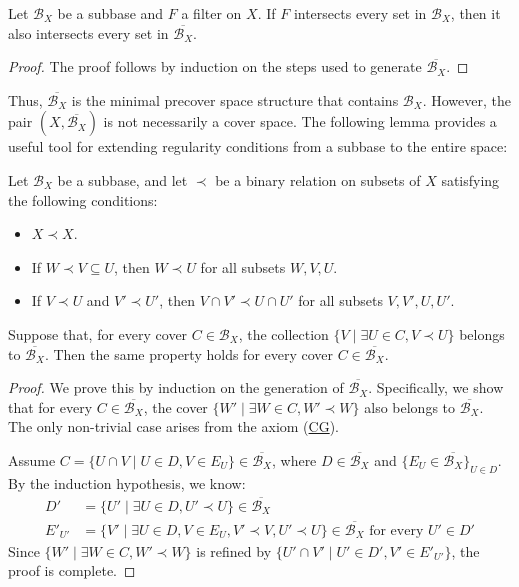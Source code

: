 \documentclass[pdflatex,sn-mathphys-num]{sn-jnl}
\newcommand{\axref}[1]{(\hyperref[ax:#1]{#1})}
\theoremstyle{definition}
\theoremstyle{remark}
\numberwithin{figure}{section}
\newcommand{\rb}{\prec}
\begin{document}
\begin{lem}
Let $\mathcal{B}_X$ be a subbase and $F$ a filter on $X$.
If $F$ intersects every set in $\mathcal{B}_X$, then it also intersects every set in $\overline{\mathcal{B}_X}$.
\end{lem}
\begin{proof}
The proof follows by induction on the steps used to generate $\overline{\mathcal{B}_X}$.
\end{proof}

Thus, $\overline{\mathcal{B}_X}$ is the minimal precover space structure that contains $\mathcal{B}_X$.
However, the pair $(X, \overline{\mathcal{B}_X})$ is not necessarily a cover space.
The following lemma provides a useful tool for extending regularity conditions from a subbase to the entire space:

\begin{lem}
Let $\mathcal{B}_X$ be a subbase, and let $\rb$ be a binary relation on subsets of $X$ satisfying the following conditions:
\begin{itemize}
\item $X \rb X$.
\item If $W \rb V \subseteq U$, then $W \rb U$ for all subsets $W,V,U$.
\item If $V \rb U$ and $V' \rb U'$, then $V \cap V' \rb U \cap U'$ for all subsets $V,V',U,U'$.
\end{itemize}
Suppose that, for every cover $C \in \mathcal{B}_X$, the collection $\{ V \mid \exists U \in C, V \rb U \}$ belongs to $\overline{\mathcal{B}_X}$.
Then the same property holds for every cover $C \in \overline{\mathcal{B}_X}$.
\end{lem}
\begin{proof}
We prove this by induction on the generation of $\overline{\mathcal{B}_X}$.
Specifically, we show that for every $C \in \overline{\mathcal{B}_X}$, the cover $\{ W' \mid \exists W \in C, W' \rb W \}$ also belongs to $\overline{\mathcal{B}_X}$.
The only non-trivial case arises from the axiom \axref{CG}.

Assume $C = \{ U \cap V \mid U \in D, V \in E_U \} \in \overline{\mathcal{B}_X}$, where $D \in \overline{\mathcal{B}_X}$ and $\{ E_U \in \overline{\mathcal{B}_X} \}_{U \in D}$.
By the induction hypothesis, we know:
\begin{align*}
D' & = \{ U' \mid \exists U \in D, U' \rb U \} \in \overline{\mathcal{B}_X} \\
E'_{U'} & = \{ V' \mid \exists U \in D, V \in E_U, V' \rb V, U' \rb U \} \in \overline{\mathcal{B}_X} \text{ for every } U' \in D'
\end{align*}
Since $\{ W' \mid \exists W \in C, W' \rb W \}$ is refined by $\{ U' \cap V' \mid U' \in D', V' \in E'_{U'} \}$, the proof is complete.
\end{proof}
\end{document}
